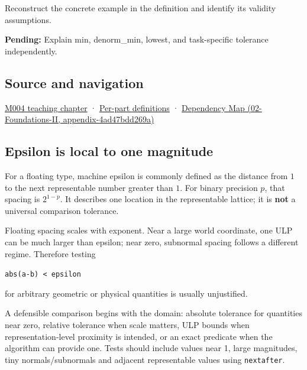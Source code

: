 Reconstruct the concrete example in the definition and identify its validity assumptions.

\textbf{Pending:} Explain min, denorm\_min, lowest, and task-specific tolerance independently.

\subsection{Source and navigation}\label{source-and-navigation}

\href{Continuous\%20Notes/Computing\%20Foundations\%20-\%20From\%20Bits\%20to\%20C++\%20and\%20Systems\%20APIs\#A\%20stretching\%20ruler\%20for\%20real-valued\%20quantities}{M004 teaching chapter} · \hyperref[appendix-fd090d982a15]{Per-part definitions} · \href{}{Dependency Map (02-Foundations-II, appendix-4ad47bdd269a)}

\subsection{Epsilon is local to one magnitude}\label{epsilon-is-local-to-one-magnitude}

For a floating type, machine epsilon is commonly defined as the distance from \(1\) to the next representable number greater than \(1\). For binary precision \(p\), that spacing is \(2^{1-p}\). It describes one location in the representable lattice; it is \textbf{not} a universal comparison tolerance.

Floating spacing scales with exponent. Near a large world coordinate, one ULP can be much larger than epsilon; near zero, subnormal spacing follows a different regime. Therefore testing

\texttt{abs(a-b)\ \textless{}\ epsilon}

for arbitrary geometric or physical quantities is usually unjustified.

A defensible comparison begins with the domain: absolute tolerance for quantities near zero, relative tolerance when scale matters, ULP bounds when representation-level proximity is intended, or an exact predicate when the algorithm can provide one. Tests should include values near 1, large magnitudes, tiny normals/subnormals and adjacent representable values using \texttt{nextafter}.
